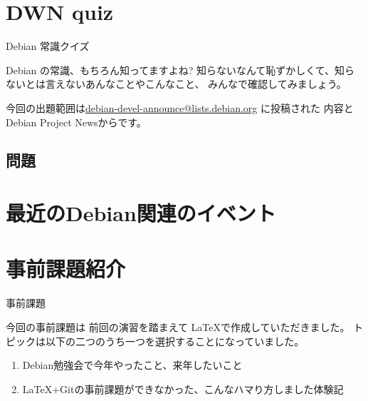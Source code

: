 \section{DWN quiz}
\begin{frame}{Debian 常識クイズ}

Debian の常識、もちろん知ってますよね?
知らないなんて恥ずかしくて、知らないとは言えないあんなことやこんなこと、
みんなで確認してみましょう。

今回の出題範囲は\url{debian-devel-announce@lists.debian.org} に投稿された
内容とDebian Project Newsからです。

\end{frame}

\subsection{問題}


\section{最近のDebian関連のイベント}


\section{事前課題紹介}

\begin{frame}{事前課題}

今回の事前課題は
前回の演習を踏まえて \LaTeX{}で作成していただきました。
トピックは以下の二つのうち一つを選択することになっていました。

\begin{enumerate}
 \item Debian勉強会で今年やったこと、来年したいこと
 \item \LaTeX{}+Gitの事前課題ができなかった、こんなハマり方しました体験記
\end{enumerate}

\end{frame}


{\footnotesize

}

